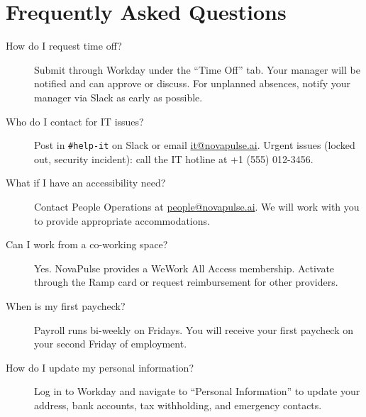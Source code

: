 \documentclass[
    language=english,
    doctype=onboarding-guide,
    institution=none,
]{../../omnilatex}
\begin{document}
\section{Frequently Asked Questions}

\begin{description}
    \item[How do I request time off?] Submit through Workday under the
        ``Time Off'' tab. Your manager will be notified and can approve or
        discuss. For unplanned absences, notify your manager via Slack as
        early as possible.
    \item[Who do I contact for IT issues?] Post in \texttt{\#help-it} on
        Slack or email \href{mailto:it@novapulse.ai}{it@novapulse.ai}.
        Urgent issues (locked out, security incident): call the IT hotline
        at +1 (555) 012-3456.
    \item[What if I have an accessibility need?] Contact People Operations
        at \href{mailto:people@novapulse.ai}{people@novapulse.ai}. We will
        work with you to provide appropriate accommodations.
    \item[Can I work from a co-working space?] Yes. NovaPulse provides a
        WeWork All Access membership. Activate through the Ramp card or
        request reimbursement for other providers.
    \item[When is my first paycheck?] Payroll runs bi-weekly on Fridays.
        You will receive your first paycheck on your second Friday of
        employment.
    \item[How do I update my personal information?] Log in to Workday and
        navigate to ``Personal Information'' to update your address, bank
        accounts, tax withholding, and emergency contacts.
\end{description}

\printbibliography[heading=none]
\end{document}
